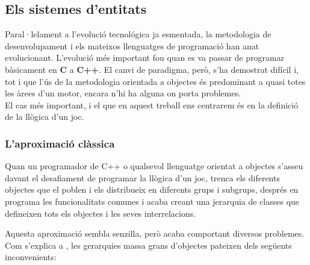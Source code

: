 \subsection{Els sistemes d'entitats}

Paral·lelament a l'evolució tecnológica ja esmentada, la metodologia de desenvolupament i els mateixos llenguatges de programació han anat evolucionant. L'evolució més important fou quan es va passar de programar bàsicament en {\bf C} a {\bf C++}. El canvi de paradigma, però, s'ha demostrat difícil i, tot i que l'ús de la metodologia orientada a objectes és predominant a quasi totes les àrees d'un motor, encara n'hi ha alguna on porta problemes.
\\

El cas més important, i el que en aquest treball ens centrarem és en la definició de la llògica d'un joc.

\subsubsection{L'aproximació clàssica}

Quan un programador de {C++} o qualsevol llenguatge orientat a objectes s'asseu davant el desafiament de programar la llògica d'un joc, trenca els diferents objectes que el poblen i els distribueix en diferents grups i subgrups, després en programa les funcionalitats comunes i acaba creant una jerarquia de classes que defineixen tots els objectes i les seves interrelacions. 

Aquesta aproximació sembla senzilla, però acaba comportant diversos problemes. Com s'explica a \citep[p.~719]{Gregory09}, les gerarquies massa grans d'objectes pateixen dels següents inconvenients:

